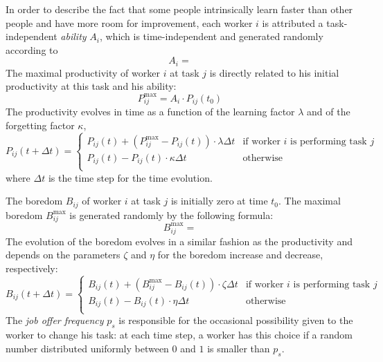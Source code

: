 In order to describe the fact that some people intrinsically learn faster than other people and have more room for improvement, each worker $i$ is attributed a task-independent \emph{ability} $A_i$, which is time-independent and generated randomly according to
\begin{equation}
	A_{i} = 
\end{equation}
The maximal productivity of worker $i$ at task $j$ is directly related to his initial productivity at this task and his ability:
\begin{equation}
	P_{ij}^\textrm{max} = A_i \cdot P_{ij}(t_0)
\end{equation}
The productivity evolves in time as a function of the learning factor $\lambda$ and of the forgetting factor $\kappa$, 
\begin{equation}
	P_{ij}(t+\Delta t) = \begin{cases}
		P_{ij}(t) + (P_{ij}^\textrm{max}-P_{ij}(t)) \cdot \lambda \Delta t & \text{if worker $i$ is performing task $j$}\\
		P_{ij}(t) - P_{ij}(t) \cdot \kappa \Delta t & \text{otherwise}\\
		\end{cases}
\end{equation}
where $\Delta t$ is the time step for the time evolution.

The boredom $B_{ij}$ of worker $i$ at task $j$ is initially zero at time $t_0$. The maximal boredom $B_{ij}^\textrm{max}$ is generated randomly by the following formula:
\begin{equation}
	B_{ij}^\textrm{max} = 
\end{equation}
The evolution of the boredom evolves in a similar fashion as the productivity and depends on the parameters $\zeta$ and $\eta$ for the boredom increase and decrease, respectively:
\begin{equation}
	B_{ij}(t+\Delta t) = \begin{cases}
		B_{ij}(t) + (B_{ij}^\textrm{max}-B_{ij}(t)) \cdot \zeta \Delta t & \text{if worker $i$ is performing task $j$}\\
		B_{ij}(t) - B_{ij}(t) \cdot \eta \Delta t & \text{otherwise}\\
		\end{cases}
\end{equation}
The \emph{job offer frequency} $p_s$ is responsible for the occasional possibility given to the worker to change his task: at each time step, a worker has this choice if a random number distributed uniformly between $0$ and $1$ is smaller than $p_s$.

